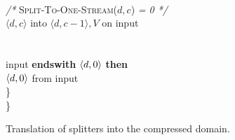 \begin{figure}[t!]
\begin{minipage}{0.78\textwidth}
\tab\tab{}\\
\tab\tab{} {\it /*} \textsc{Split-To-One-Stream}($d, c$) {\it = 0 */} \\
\tab\tab\tab{} $\langle d,c \rangle$ into $\langle d,c-1\rangle,V$ on input\\
\tab\tab\tab\\
\tab\tab{}\\
\tab\tab{} input {\bf endswith} $\langle d, 0\rangle$ {\bf then}\\
\tab\tab\tab{} $\langle d, 0\rangle$ from input\\
\tab\}\\
\}
\end{minipage}
\caption[Translation of splitters into the compressed
  domain.]{Translation of splitters into the compressed domain.
\protect\label{fig:translate-splitter}}
\end{figure}

